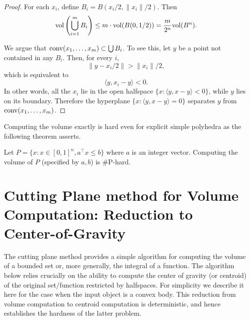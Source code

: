 \begin{proof}
For each $x_{i}$, define $B_{i}=B(x_{i}/2,\|x_{i}\|/2)$. Then 
\[
\mathrm{vol}\left(\bigcup^{m}_{i=1}B_{i}\right)\le m\cdot\mathrm{vol}(B(0,1/2))=\frac{m}{2^{n}}\mathrm{vol}(B^{n}).
\]

We argue that $\mathrm{conv}(x_{1},\ldots,x_{m})\subset\bigcup B_{i}$. To
see this, let $y$ be a point not contained in any $B_{i}$. Then,
for every $i$, 
\[
\|y-x_{i}/2\|>\|x_{i}\|/2,
\]
which is equivalent to
\[
\langle y,x_{i}-y\rangle<0.
\]
In other words, all the $x_{i}$ lie in the open halfspace $\{x:\langle y,x-y\rangle<0\}$,
while $y$ lies on its boundary. Therefore the hyperplane $\{x:\langle y,x-y\rangle=0\}$
separates $y$ from $\mathrm{conv}(x_{1},\ldots,x_{m})$. 
\end{proof}
Computing the volume exactly is hard even for explicit simple polyhedra
as the following theorem asserts.
\begin{thm}
\cite{DF88} Let $P=\{x:x\in[0,1]^{n},a^{\top}x\le b\}$ where $a$
is an integer vector. Computing the volume of $P$ (specified by $a,b$)
is $\#$P-hard. 
\end{thm}


\section{Cutting Plane method for Volume Computation: Reduction to Center-of-Gravity}

The cutting plane method provides a simple algorithm for computing
the volume of a bounded set or, more generally, the integral of a
function. The algorithm below relies crucially on the ability to compute
the center of gravity (or centroid) of the original set/function restricted
by halfspaces. For simplicity we describe it here for the case when
the input object is a convex body. This reduction from volume computation
to centroid computation is deterministic, and hence establishes the
hardness of the latter problem.

